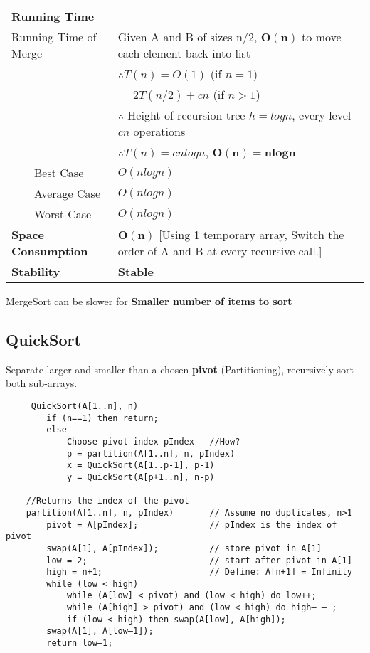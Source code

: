 \documentclass{article}
\newcommand{\tabitem}{~~\llap{\textbullet}~~}
\begin{document}
    \begin{tabular}{ll}
        \toprule
        \textbf{Running Time} & \\
        Running Time of Merge & Given A and B of sizes n/2, $\bm{O(n)}$ to move each element back into list\\
        & $\therefore T(n) = O(1)$ (if $n = 1$)\\
        & $= 2T(n/2) + cn$ (if $n > 1$)\\
        & $\therefore$ Height of recursion tree $h = logn$, every level $cn$ operations\\
        & $\therefore T(n) = cnlogn$, $\bm{O(n) = nlogn}$\\
        \tabitem Best Case & $O(nlogn)$\\
        \tabitem Average Case & $O(nlogn)$\\
        \tabitem Worst Case & $O(nlogn)$\\
        \midrule
        \textbf{Space Consumption} & $\bm{O(n)}$ [Using 1 temporary array, Switch the order of A and B at
        every recursive call.]\\
        \midrule
        \textbf{Stability} & \textbf{Stable}\\
        \bottomrule
    \end{tabular}

    \bigskip

    MergeSort can be slower for \textbf{Smaller number of items to sort}

    \pagebreak

    \subsection{QuickSort}

    Separate larger and smaller than a chosen \textbf{pivot} (Partitioning), recursively sort both sub-arrays.
    
    \label{partition}
    
    \begin{verbatim}
     QuickSort(A[1..n], n)
        if (n==1) then return;
        else
            Choose pivot index pIndex   //How?
            p = partition(A[1..n], n, pIndex)
            x = QuickSort(A[1..p-1], p-1)
            y = QuickSort(A[p+1..n], n-p)

    //Returns the index of the pivot
    partition(A[1..n], n, pIndex)       // Assume no duplicates, n>1
        pivot = A[pIndex];              // pIndex is the index of pivot
        swap(A[1], A[pIndex]);          // store pivot in A[1]
        low = 2;                        // start after pivot in A[1]
        high = n+1;                     // Define: A[n+1] = Infinity
        while (low < high)
            while (A[low] < pivot) and (low < high) do low++;
            while (A[high] > pivot) and (low < high) do high– – ;
            if (low < high) then swap(A[low], A[high]);
        swap(A[1], A[low–1]);
        return low–1;
    \end{verbatim}
    
\end{document}
